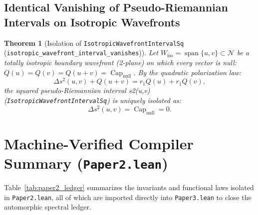 \documentclass[11pt,reqno]{amsart}
\newtheorem{theorem}{Theorem}[section]
\theoremstyle{definition}
\theoremstyle{remark}
\newcommand{\CapNull}{\operatorname{Cap}_{\mathrm{null}}}
\begin{document}
\subsection{Identical Vanishing of Pseudo-Riemannian Intervals on Isotropic Wavefronts}

\begin{theorem}[Isolation of \texttt{IsotropicWavefrontIntervalSq} (\texttt{isotropic\_wavefront\_interval\_vanishes})]
\label{thm:isotropic_wavefront}
Let $W_{\mathrm{iso}} = \operatorname{span}\{u,v\} \subset \mathcal{N}$ be a totally isotropic boundary wavefront (2-plane) on which every vector is null: $Q(u) = Q(v) = Q(u+v) = \CapNull$. By the quadratic polarization law:
\begin{equation}
  \Delta s^2(u,v) + Q(u+v) = r_1 Q(u) + r_1 Q(v),
\end{equation}
the squared pseudo-Riemannian interval s2(u,v) (\texttt{IsotropicWavefrontIntervalSq}) is uniquely isolated as:
\begin{equation}
  \Delta s^2(u,v) = \CapNull = 0.
\end{equation}
\end{theorem}

\section{Machine-Verified Compiler Summary (\texttt{Paper2.lean})}

Table~\ref{tab:paper2_ledger} summarizes the invariants and functional laws isolated in \texttt{Paper2.lean}, all of which are imported directly into \texttt{Paper3.lean} to close the automorphic spectral ledger.
\end{document}
